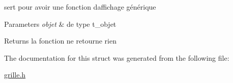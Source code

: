 sert pour avoir une fonction d\textquotesingle{}affichage générique 


\begin{DoxyParams}{Parameters}
{\em objet} & de type t\+\_\+objet \\
\hline
\end{DoxyParams}
\begin{DoxyReturn}{Returns}
la fonction ne retourne rien 
\end{DoxyReturn}


The documentation for this struct was generated from the following file\+:\begin{DoxyCompactItemize}
\item 
\hyperlink{grille_8h}{grille.\+h}\end{DoxyCompactItemize}
